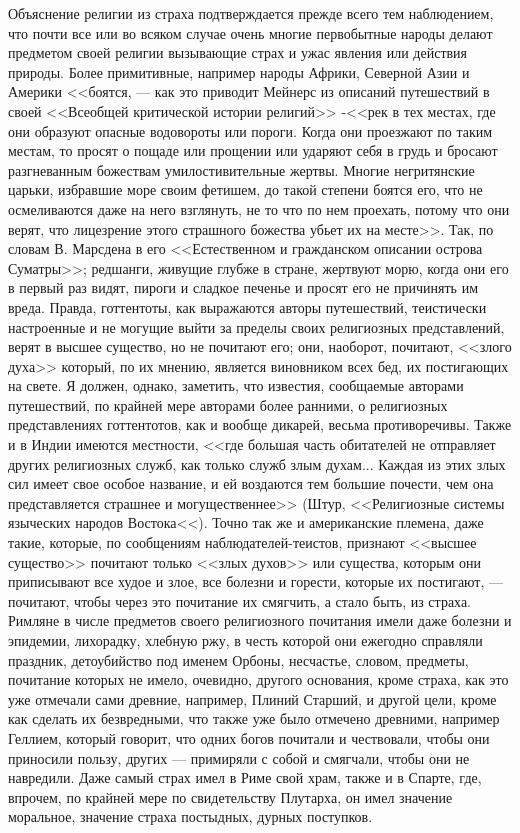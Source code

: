 \documentclass[12pt]{article}
\begin{document}
Объяснение религии из страха подтверждается прежде всего тем наблюдением, что почти все или во всяком случае очень многие первобытные народы делают предметом своей религии вызывающие страх и ужас явления или действия природы. Более примитивные, например народы Африки, Северной Азии и Америки <<боятся, --- как это приводит Мейнерс из описаний путешествий в своей <<Всеобщей критической истории религий>> -<<рек в тех местах, где они образуют опасные водовороты или пороги. Когда они проезжают по таким местам, то просят о пощаде или прощении или ударяют себя в грудь и бросают разгневанным божествам умилостивительные жертвы. Многие негритянские царьки, избравшие море своим фетишем, до такой степени боятся его, что не осмеливаются даже на него взглянуть, не то что по нем проехать, потому что они верят, что лицезрение этого страшного божества убьет их на месте>>. Так, по словам В. Марсдена в его <<Естественном и гражданском описании острова Суматры>>; редшанги, живущие глубже в стране, жертвуют морю, когда они его в первый раз видят, пироги и сладкое печенье и просят его не причинять им вреда. Правда, готтентоты, как выражаются авторы путешествий, теистически настроенные и не могущие выйти за пределы своих религиозных представлений, верят в высшее существо, но не почитают его; они, наоборот, почитают, <<злого духа>>  который, по их мнению, является виновником всех бед, их постигающих на свете. Я должен, однако, заметить, что известия, сообщаемые авторами путешествий, по крайней мере авторами более ранними, о религиозных представлениях готтентотов, как и вообще дикарей, весьма противоречивы. Также и в Индии имеются местности, <<где большая часть обитателей не отправляет других религиозных служб, как только служб злым духам... Каждая из этих злых сил имеет свое особое название, и ей воздаются тем большие почести, чем она представляется страшнее и могущественнее>> (Штур, <<Религиозные системы языческих народов Востока<<). Точно так же и американские племена, даже такие, которые, по сообщениям наблюдателей-теистов, признают <<высшее существо>>  почитают только <<злых духов>>  или существа, которым они приписывают все худое и злое, все болезни и горести, которые их постигают, --- почитают, чтобы через это почитание их смягчить, а стало быть, из страха. Римляне в числе предметов своего религиозного почитания имели даже болезни и эпидемии, лихорадку, хлебную ржу, в честь которой они ежегодно справляли праздник, детоубийство под именем Орбоны, несчастье, словом, предметы, почитание которых не имело, очевидно, другого основания, кроме страха, как это уже отмечали сами древние, например, Плиний Старший, и другой цели, кроме как сделать их безвредными, что также уже было отмечено древними, например Геллием, который говорит, что одних богов почитали и чествовали, чтобы они приносили пользу, других --- примиряли с собой и смягчали, чтобы они не навредили. Даже самый страх имел в Риме свой храм, также и в Спарте, где, впрочем, по крайней мере по свидетельству Плутарха, он имел значение моральное, значение страха постыдных, дурных поступков. 
\end{document}
